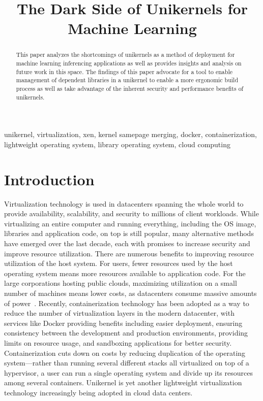 \documentclass[conference]{IEEEtran}
\begin{document}
\title{The Dark Side of Unikernels for Machine Learning}

\author{
}

\maketitle

\begin{abstract}
	This paper analyzes the shortcomings of unikernels as a method
	of deployment for machine learning inferencing applications as
	well as provides insights and analysis on future work in this
	space. The findings of this paper advocate for a tool to enable
	management of dependent libraries in a unikernel to enable a
	more ergonomic build process as well as take advantage of the
	inherent security and performance benefits of unikernels.
\end{abstract}

\begin{IEEEkeywords}
	unikernel, virtualization, xen, kernel samepage merging,
	docker, containerization, lightweight operating system, library
	operating system, cloud computing
\end{IEEEkeywords}

\section{Introduction}

Virtualization technology is used in datacenters spanning the
whole world to provide availability, scalability, and security to
millions of client workloads. While virtualizing an entire
computer and running everything, including the OS image,
libraries and application code, on top is still popular, many
alternative methods have emerged over the last decade, each with
promises to increase security and improve resource utilization.
There are numerous benefits to improving resource utilization of
the host system. For users, fewer resources used by the host
operating system means more resources available to application
code. For the large corporations hosting public clouds,
maximizing utilization on a small number of machines means lower
costs, as datacenters consume massive amounts of
power~\cite{directenergy}.  Recently, containerization technology
has been adopted as a way to reduce the number of virtualization
layers in the modern datacenter, with services like Docker
providing benefits including easier deployment, ensuring
consistency between the development and production environments,
providing limits on resource usage, and sandboxing applications
for better security.  Containerization cuts down on costs by
reducing duplication of the operating system—rather than running
several different stacks all virtualized on top of a hypervisor,
a user can run a single operating system and divide up its
resources among several containers. Unikernel is yet another
lightweight virtualization technology increasingly being adopted
in cloud data centers.
\end{document}
